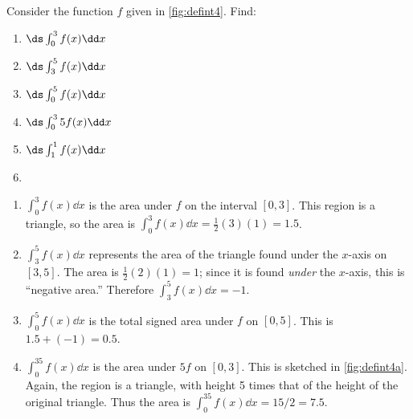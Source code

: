 \begin{example}\label{ex_defint4}%
Consider the function $f$ given in \autoref{fig:defint4}. Find:
%
%
\begin{multicols}{2}
\begin{enumerate}
	\item	$\ds \int_0^3 f(x)\dd x$
	\item	$\ds \int_3^5 f(x)\dd x$
	\item	$\ds \int_0^5 f(x)\dd x$
	\item	$\ds \int_0^3 5f(x)\dd x$
	\item	$\ds \int_1^1 f(x)\dd x$
	\item[]
\end{enumerate}
\end{multicols}
\solution
\begin{enumerate}
	\item	$ \int_0^3 f(x)\dd x$ is the area under $f$ on the interval $[0,3]$. This region is a triangle, so the area is $\int_0^3 f(x)\dd x=\frac12(3)(1) = 1.5$. 
	\item	$\int_3^5 f(x)\dd x$ represents the area of the triangle found under the $x$-axis on $[3,5]$. The area is $\frac12(2)(1) = 1$; since it is found \emph{under} the $x$-axis, this is ``negative area.'' Therefore $ \int_3^5 f(x)\dd x = -1$.
	\item	$ \int_0^5f(x)\dd x$ is the total signed area under $f$ on $[0,5]$. This is $1.5 + (-1) = 0.5$.
	\item	$ \int_0^35f(x)\dd x$ is the area under $5f$ on $[0,3]$. This is sketched in \autoref{fig:defint4a}. Again, the region is a triangle, with height 5 times that of the height of the original triangle. Thus the area is $ \int_0^35f(x)\dd x = 15/2 = 7.5.$
		

\end{enumerate}
\end{example}
